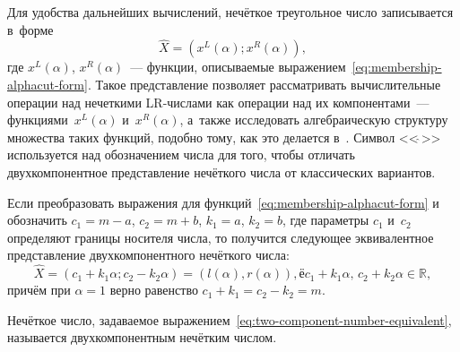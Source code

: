Для удобства дальнейших вычислений, нечёткое треугольное число записывается в~форме
\begin{equation}
\label{eq:two-component-number}
  \hat{X} = \left(x^L\left(\alpha \right); x^R\left(\alpha \right) \right),
\end{equation}
где $x^L\left(\alpha \right)$, $x^R\left(\alpha \right)$~--- функции, описываемые выражением~\eqref{eq:membership-alphacut-form}. Такое представление позволяет рассматривать вычислительные операции над нечеткими LR-числами как операции над их компонентами~---  функциями~$x^L\left(\alpha \right)$ и~$x^R\left(\alpha \right)$, а~также исследовать алгебраическую структуру множества таких функций, подобно тому, как это делается в~\cite{Kosinski}. Символ <<$\hat{\ }$>> используется над обозначением числа для того, чтобы отличать двухкомпонентное представление нечёткого числа от классических вариантов.

Если преобразовать выражения для функций~\eqref{eq:membership-alphacut-form} и обозначить $c_1=m-a$, $c_2=m+b$, $k_1=a$, $k_2=b$, где параметры $c_1$ и~$c_2$ определяют границы носителя числа, то получится следующее эквивалентное представление  двухкомпонентного нечёткого числа:
\begin{equation}
\label{eq:two-component-number-equivalent}
  \hat{X} = \left(c_1+k_1\alpha; c_2-k_2\alpha \right) = \left(l\left(\alpha \right), r\left(\alpha \right) \right),ё c_1+k_1\alpha,\, c_2+k_2\alpha \in \mathbb{R},
\end{equation}
причём при $\alpha=1$ верно равенство $c_1+k_1=c_2-k_2=m$.

\begin{mydef}
  Нечёткое число, задаваемое выражением~\eqref{eq:two-component-number-equivalent}, называется двухкомпонентным нечётким числом.
\end{mydef}

